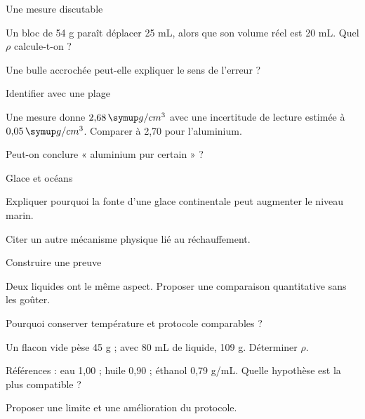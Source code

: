 \par\noindent\begin{minipage}{\linewidth}
\begin{exercice}[3]{Une mesure discutable}
\begin{questions}
\item Un bloc de 54 g paraît déplacer 25 mL, alors que son volume réel est 20 mL. Quel $\rho$ calcule-t-on ?
\item Une bulle accrochée peut-elle expliquer le sens de l’erreur ?
\end{questions}
\end{exercice}
\end{minipage}
\par\noindent\begin{minipage}{\linewidth}
\begin{exercice}[3]{Identifier avec une plage}
\begin{questions}
\item Une mesure donne $2{,}68\unite{g/cm^3}$ avec une incertitude de lecture estimée à $0{,}05\unite{g/cm^3}$. Comparer à 2,70 pour l’aluminium.
\item Peut-on conclure « aluminium pur certain » ?
\end{questions}
\end{exercice}
\end{minipage}
\par\noindent\begin{minipage}{\linewidth}
\begin{exercice}[3]{Glace et océans}
\begin{questions}
\item Expliquer pourquoi la fonte d’une glace continentale peut augmenter le niveau marin.
\item Citer un autre mécanisme physique lié au réchauffement.
\end{questions}
\end{exercice}
\end{minipage}
\par\noindent\begin{minipage}{\linewidth}
\begin{exercice}[3]{Construire une preuve}
\begin{questions}
\item Deux liquides ont le même aspect. Proposer une comparaison quantitative sans les goûter.
\item Pourquoi conserver température et protocole comparables ?
\end{questions}
\end{exercice}
\end{minipage}
\label{defi-ex-1}
\begin{questions}
\item Un flacon vide pèse 45 g ; avec 80 mL de liquide, 109 g. Déterminer $\rho$.
\item Références : eau 1,00 ; huile 0,90 ; éthanol 0,79 g/mL. Quelle hypothèse est la plus compatible ?
\item Proposer une limite et une amélioration du protocole.
\end{questions}
\pcGrille
